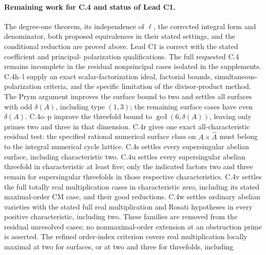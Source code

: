 








\paragraph{Remaining work for C.4 and status of Lead C1.}
The degree-one theorem, its independence of $\ell$, the corrected
integral form and denominator, both proposed equivalences in their
stated settings, and the conditional reduction are proved above.
Lead C1 is correct with the stated coefficient and principal-
polarization qualifications. The full requested C.4 remains
incomplete in the residual nonprincipal cases isolated in the
supplements. C.4h--l supply an exact scalar-factorization ideal,
factorial bounds, simultaneous-polarization criteria, and the specific
limitation of the divisor-product method. The Prym argument improves
the surface bound to two and settles all surfaces with odd
$\delta(A)$, including type $(1,3)$; the remaining surface cases have
even $\delta(A)$. C.4o--p improve the threefold bound to
$\gcd(6,\delta(A))$, leaving only primes two and three in that
dimension. C.4r gives one exact all-characteristic residual test:
the specified rational numerical surface class on $A\times\widehat A$
must belong to the integral numerical cycle lattice. C.4s settles
every supersingular abelian surface, including characteristic two.
C.4u settles every supersingular abelian threefold in
characteristic at least five; only the indicated factors two
and three remain for supersingular threefolds in those respective
characteristics.
C.4v settles the full totally real multiplication cases in
characteristic zero, including its stated maximal-order CM
case, and their good reductions. C.4w settles ordinary
abelian varieties with the stated full real multiplication
and Rosati hypotheses in every positive characteristic,
including two. These families are removed from the
residual unresolved cases; no nonmaximal-order extension
at an obstruction prime is asserted. The refined order-index
criterion covers real multiplication locally maximal at two
for surfaces, or at two and three for threefolds, including
